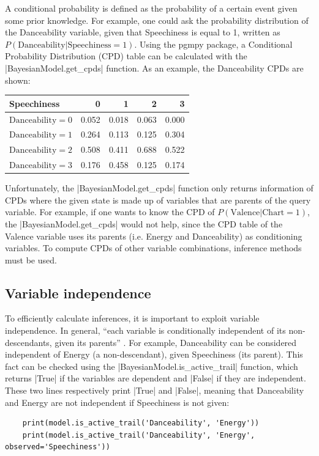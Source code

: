 \documentclass[a4paper, 12pt]{article}
\begin{document}
A conditional probability is defined as the probability of a certain event given some prior knowledge. For example, one could ask the probability distribution of the Danceability variable, given that Speechiness is equal to 1, written as $P\left(\mathrm{Danceability} | \mathrm{Speechiness} = 1\right)$. Using the pgmpy package, a Conditional Probability Distribution (CPD) table can be calculated with the \spverb|BayesianModel.get_cpds| function. As an example, the Danceability CPDs are shown:
\begin{center}
    \begin{tabular}{lrrrr}
        \toprule
        Speechiness                 & 0     & 1     & 2     & 3     \\
        \midrule
        $\mathrm{Danceability} = 0$ & 0.052 & 0.018 & 0.063 & 0.000 \\
        $\mathrm{Danceability} = 1$ & 0.264 & 0.113 & 0.125 & 0.304 \\
        $\mathrm{Danceability} = 2$ & 0.508 & 0.411 & 0.688 & 0.522 \\
        $\mathrm{Danceability} = 3$ & 0.176 & 0.458 & 0.125 & 0.174 \\
        \bottomrule
    \end{tabular}
\end{center}

Unfortunately, the \spverb|BayesianModel.get_cpds| function only returns information of CPDs where the given state is made up of variables that are parents of the query variable. For example, if one wants to know the CPD of $P\left(\mathrm{Valence} | \mathrm{Chart} = 1\right)$, the \spverb|BayesianModel.get_cpds| would not help, since the CPD table of the Valence variable uses its parents (i.e. Energy and Danceability) as conditioning variables. To compute CPDs of other variable combinations, inference methods must be used.


\subsection{Variable independence}

To efficiently calculate inferences, it is important to exploit variable independence. In general, ``each variable is conditionally independent of its non-descendants, given its parents'' \cite{probabilistic-reasoning}. For example, Danceability can be considered independent of Energy (a non-descendant), given Speechiness (its parent). This fact can be checked using the \spverb|BayesianModel.is_active_trail| function, which returns \spverb|True| if the variables are dependent and \spverb|False| if they are independent. These two lines respectively print \spverb|True| and \spverb|False|, meaning that Danceability and Energy are not independent if Speechiness is not given:
\begin{verbatim}
    print(model.is_active_trail('Danceability', 'Energy'))
    print(model.is_active_trail('Danceability', 'Energy', observed='Speechiness'))
\end{verbatim}
\end{document}
